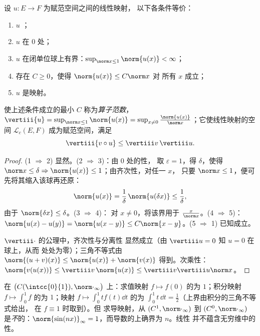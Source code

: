 \begin{theorem}[刻画]\label{thm:b2:nvs:continuouslinear}
设 $u \colon E \to F$ 为赋范空间之间的线性映射，
以下各条件等价：
\begin{enumerate}
  \item $u$ ；
  \item $u$ 在 $0$ 处；
  \item $u$ 在闭单位球上有界：$\sup_{\norm x \leq
        1} \norm{u(x)} < \infty$；
  \item 存在 $C \geq 0$，使得 $\norm{u(x)} \leq C \norm x$ 对
        所有 $x$ 成立；
  \item $u$ 是映射。
\end{enumerate}
使上述条件成立的最小 $C$ 称为\emph{算子范数}，
$\vertiii{u} = \sup_{\norm x \leq 1}\norm{u(x)} = \sup_{x \neq 0}
\frac{\norm{u(x)}}{\norm x}$；它使线性映射的空间 $\mathcal{L}_c(E,
F)$ 成为赋范空间，满足
\[
\vertiii{v \circ u} \leq \vertiii v\, \vertiii u .
\]
\end{theorem}

\begin{proof}
(1 $\Rightarrow$ 2) 显然。(2 $\Rightarrow$ 3)：由 $0$ 处的性，
取 $\varepsilon = 1$，得 $\delta$，使得 $\norm x \leq \delta
\Rightarrow \norm{u(x)} \leq 1$；由齐次性，对任一 $x$，
只要 $\norm x \leq 1$，便可先将其缩入该球再还原：
\[
\norm{u(x)} = \frac1\delta\,\norm{u(\delta x)} \leq
\frac1\delta ,
\]
由于 $\norm{\delta x} \leq \delta$。(3 $\Rightarrow$ 4)：
对 $x \neq 0$，将该界用于 $\frac{x}{\norm x}$。(4
$\Rightarrow$ 5)：$\norm{u(x) - u(y)} = \norm{u(x - y)} \leq
C\norm{x - y}$。(5 $\Rightarrow$ 1) 已知成立。

$\vertiii\cdot$ 的公理中，齐次性与分离性
显然成立（由 $\vertiii u = 0$ 知 $u = 0$ 在球上，从而
处处为零）；三角不等式由 $\norm{(u + v)(x)} \leq
\norm{u(x)} + \norm{v(x)}$ 得到。次乘性：$\norm{v(u(x))}
\leq \vertiii v\,\norm{u(x)} \leq \vertiii v \vertiii u \norm x$。
\end{proof}

\begin{example}\label{ex:b2:nvs:operatornorms}
在 $\bigl(C(\intcc{0}{1}), \norm\cdot_\infty\bigr)$ 上：求值映射
$f \mapsto f(0)$ 的为 $1$；积分映射 $f \mapsto
\int_0^1 f$ 的为 $1$；映射 $f \mapsto \int_0^1 t f(t)\dd t$
的为 $\int_0^1 t\,\dd t = \frac12$（上界由积分的三角不等式给出，
在 $f \equiv 1$ 时取到）。但
求导映射，从 $(C^1, \norm\cdot_\infty)$ 到 $(C^0,
\norm\cdot_\infty)$ 是\emph{不}的：$\norm{\sin(nx)}_\infty
= 1$，而导数的上确界为 $n$。线性
并不蕴含无穷维中的性。
\end{example}

